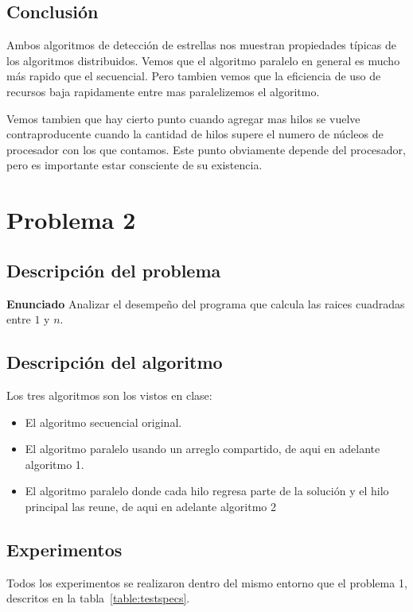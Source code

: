 \documentclass{report}
\begin{document}
\section{Conclusión}

Ambos algoritmos de detección de estrellas nos muestran propiedades típicas de los
algoritmos distribuidos. Vemos que el algoritmo paralelo en general es mucho más
rapido que el secuencial. Pero tambien vemos que la eficiencia de uso de recursos
baja rapidamente entre mas paralelizemos el algoritmo.

Vemos tambien que hay cierto punto cuando agregar mas hilos se vuelve
contraproducente cuando la cantidad de hilos supere el numero de núcleos de
procesador con los que contamos. Este punto obviamente depende del procesador, pero
es importante estar consciente de su existencia.

\chapter{Problema 2}

\section{Descripción del problema}

\textbf{Enunciado} Analizar el desempeño del programa que calcula las raices
cuadradas entre $1$ y $n$.

\section{Descripción del algoritmo}

Los tres algoritmos son los vistos en clase:

\begin{itemize}
  \item El algoritmo secuencial original.
  \item El algoritmo paralelo usando un arreglo compartido, de aqui en adelante
    algoritmo 1.
  \item El algoritmo paralelo donde cada hilo regresa parte de la solución y el
    hilo principal las reune, de aqui en adelante algoritmo 2
\end{itemize}

\section{Experimentos}

Todos los experimentos se realizaron dentro del mismo entorno que el problema 1,
descritos en la tabla~\ref{table:testspecs}.
\end{document}
